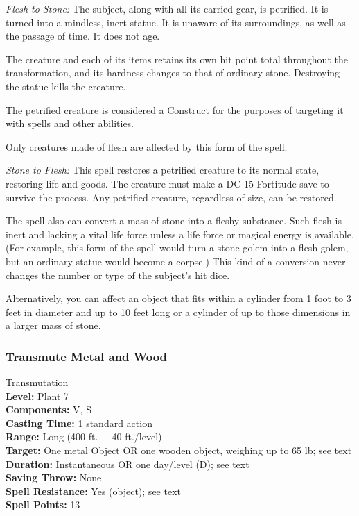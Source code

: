 \begin{list}{}{\leftmargin=1em}
 \item \emph{Flesh to Stone:} The subject, along with all its carried gear, is petrified. It is turned into a mindless, inert statue.
It is unaware of its surroundings, as well as the passage of time. It does not age.

The creature and each of its items retains its own hit point total throughout the transformation, and its hardness changes to that of ordinary stone.
Destroying the statue kills the creature.

The petrified creature is considered a Construct for the purposes of targeting it with spells and other abilities.

Only creatures made of flesh are affected by this form of the spell.
 \item \emph{Stone to Flesh:} 
This spell restores a petrified creature to its normal state, restoring life and goods. 
The creature must make a DC 15 Fortitude save to survive the process. Any petrified creature, regardless of size, can be restored.

The spell also can convert a mass of stone into a fleshy substance. 
Such flesh is inert and lacking a vital life force unless a life force or magical energy is available. 
(For example, this form of the spell would turn a stone golem into a flesh golem, but an ordinary statue would become a corpse.)
This kind of a conversion never changes the number or type of the subject's hit dice.

Alternatively, you can affect an object that fits within a cylinder from 1 foot to 3 feet in diameter and up to 10 feet long or a cylinder of up to those dimensions in a larger mass of stone. 
\end{list}
\subsubsection{Transmute Metal and Wood}
\label{Spell:TransmuteMetalAndWood}
Transmutation
\\ \textbf{Level:} Plant 7
\\ \textbf{Components:} V, S
\\ \textbf{Casting Time:} 1 standard action
\\ \textbf{Range:} Long (400 ft. + 40 ft./level)
\\ \textbf{Target:} One metal Object OR one wooden object, weighing up to 65 lb; see text
\\ \textbf{Duration:} Instantaneous OR one day/level (D); see text
\\ \textbf{Saving Throw:} None
\\ \textbf{Spell Resistance:} Yes (object); see text
\\ \textbf{Spell Points:} 13

